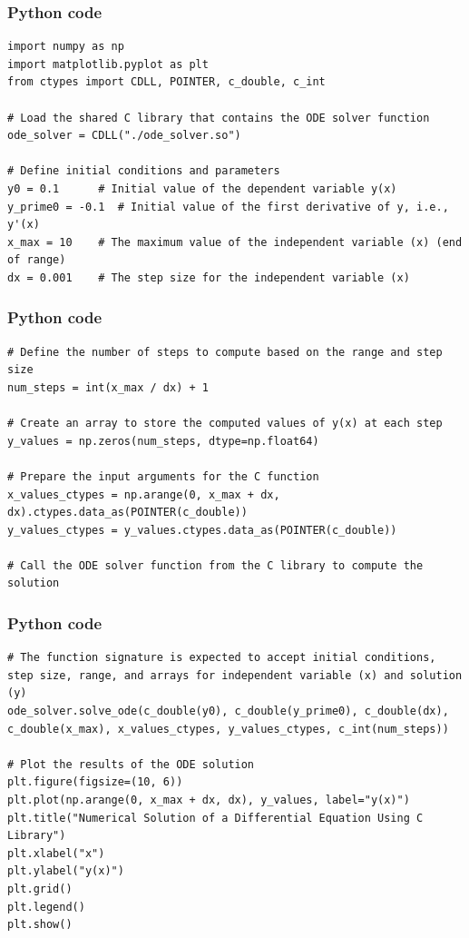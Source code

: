 \documentclass{beamer}
\begin{document}
\begin{frame}[fragile]
\frametitle{Python code}
    \begin{verbatim}
import numpy as np
import matplotlib.pyplot as plt
from ctypes import CDLL, POINTER, c_double, c_int

# Load the shared C library that contains the ODE solver function
ode_solver = CDLL("./ode_solver.so")

# Define initial conditions and parameters
y0 = 0.1      # Initial value of the dependent variable y(x)
y_prime0 = -0.1  # Initial value of the first derivative of y, i.e., y'(x)
x_max = 10    # The maximum value of the independent variable (x) (end of range)
dx = 0.001    # The step size for the independent variable (x)

\end{verbatim}
\end{frame}
\begin{frame}[fragile]
\frametitle{Python code}
\begin{verbatim}
# Define the number of steps to compute based on the range and step size
num_steps = int(x_max / dx) + 1

# Create an array to store the computed values of y(x) at each step
y_values = np.zeros(num_steps, dtype=np.float64)

# Prepare the input arguments for the C function
x_values_ctypes = np.arange(0, x_max + dx, dx).ctypes.data_as(POINTER(c_double))
y_values_ctypes = y_values.ctypes.data_as(POINTER(c_double))

# Call the ODE solver function from the C library to compute the solution

\end{verbatim}
\end{frame}

\begin{frame}[fragile]
\frametitle{Python code}
\begin{verbatim}
# The function signature is expected to accept initial conditions, step size, range, and arrays for independent variable (x) and solution (y)
ode_solver.solve_ode(c_double(y0), c_double(y_prime0), c_double(dx), c_double(x_max), x_values_ctypes, y_values_ctypes, c_int(num_steps))

# Plot the results of the ODE solution
plt.figure(figsize=(10, 6))
plt.plot(np.arange(0, x_max + dx, dx), y_values, label="y(x)")
plt.title("Numerical Solution of a Differential Equation Using C Library")
plt.xlabel("x")
plt.ylabel("y(x)")
plt.grid()
plt.legend()
plt.show()

\end{verbatim}
\end{frame}
\end{document}
